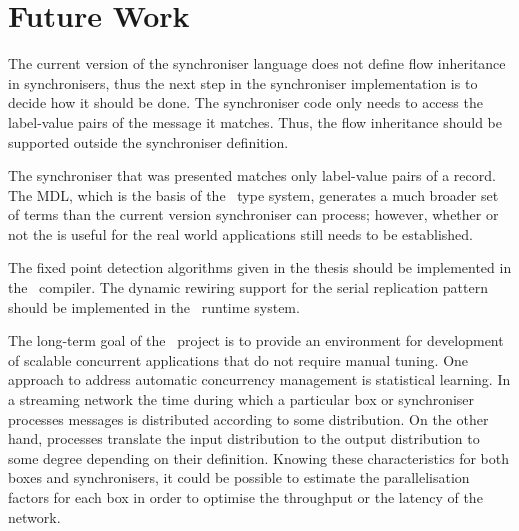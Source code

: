     \section{Future Work}
The current version of the synchroniser language does not define flow inheritance in synchronisers, thus the next step in the synchroniser implementation is to decide how it should be done. The synchroniser code only needs to access the label-value pairs of the message it matches. Thus, the flow inheritance should be supported outside the synchroniser definition.

The synchroniser that was presented matches only label-value pairs of a record. The MDL, which is the basis of the \ak\ type system, generates a much broader set of terms than the current version synchroniser can process; however, whether or not the  is useful for the real world applications still needs to be established.

The fixed point detection algorithms given in the thesis should be implemented in the \ak\ compiler. The dynamic rewiring support for the serial replication pattern should be implemented in the \ak\ runtime system.

The long-term goal of the \ak\ project is to provide an environment for development of scalable concurrent applications that do not require manual tuning. One approach to address automatic concurrency management is statistical learning. In a streaming network the time during which a particular box or synchroniser processes messages is distributed according to some distribution. On the other hand, processes translate the input distribution to the output distribution to some degree depending on their definition. Knowing these characteristics for both boxes and synchronisers, it could be possible to estimate the parallelisation factors for each box in order to optimise the throughput or the latency of the network.
